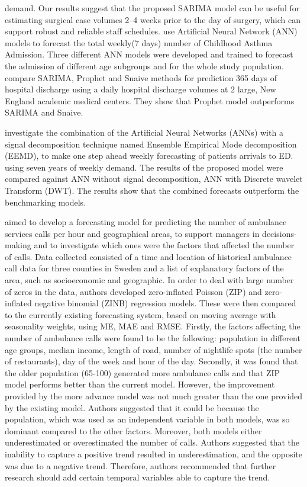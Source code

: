 \documentclass[
  authoryear,
  preprint,
  3p]{elsarticle}
\begin{document}
demand. Our results suggest that the proposed SARIMA model can be useful
for estimating surgical case volumes 2--4 weeks prior to the day of
surgery, which can support robust and reliable staff schedules.
\citet{moustris2012seven} use Artificial Neural Network (ANN) models to
forecast the total weekly(7 days) number of Childhood Asthma Admission.
Three different ANN models were developed and trained to forecast the
admission of different age subgroups and for the whole study population.
\citet{mccoy2018assessment} compare SARIMA, Prophet and Snaive methods
for prediction 365 days of hospital discharge using a daily hospital
discharge volumes at 2 large, New England academic medical centers. They
show that Prophet model outperforms SARIMA and Snaive.

\citet{khaldi2019forecasting} investigate the combination of the
Artificial Neural Networks (ANNs) with a signal decomposition technique
named Ensemble Empirical Mode decomposition (EEMD), to make one step
ahead weekly forecasting of patients arrivals to ED. using seven years
of weekly demand. The results of the proposed model were compared
against ANN without signal decomposition, ANN with Discrete wavelet
Transform (DWT). The results show that the combined forecasts outperform
the benchmarking models.

\citet{steins2019forecasting} aimed to develop a forecasting model for
predicting the number of ambulance services calls per hour and
geographical areas, to support managers in decisions-making and to
investigate which ones were the factors that affected the number of
calls. Data collected consisted of a time and location of historical
ambulance call data for three counties in Sweden and a list of
explanatory factors of the area, such as socioeconomic and geographic.
In order to deal with large number of zeros in the data, authors
developed zero-inflated Poisson (ZIP) and zero-inflated negative
binomial (ZINB) regression models. These were then compared to the
currently existing forecasting system, based on moving average with
seasonality weights, using ME, MAE and RMSE. Firstly, the factors
affecting the number of ambulance calls were found to be the following:
population in different age groups, median income, length of road,
number of nightlife spots (the number of restaurants), day of the week
and hour of the day. Secondly, it was found that the older population
(65-100) generated more ambulance calls and that ZIP model performs
better than the current model. However, the improvement provided by the
more advance model was not much greater than the one provided by the
existing model. Authors suggested that it could be because the
population, which was used as an independent variable in both models,
was so dominant compared to the other factors. Moreover, both models
either underestimated or overestimated the number of calls. Authors
suggested that the inability to capture a positive trend resulted in
underestimation, and the opposite was due to a negative trend.
Therefore, authors recommended that further research should add certain
temporal variables able to capture the trend.
\end{document}
